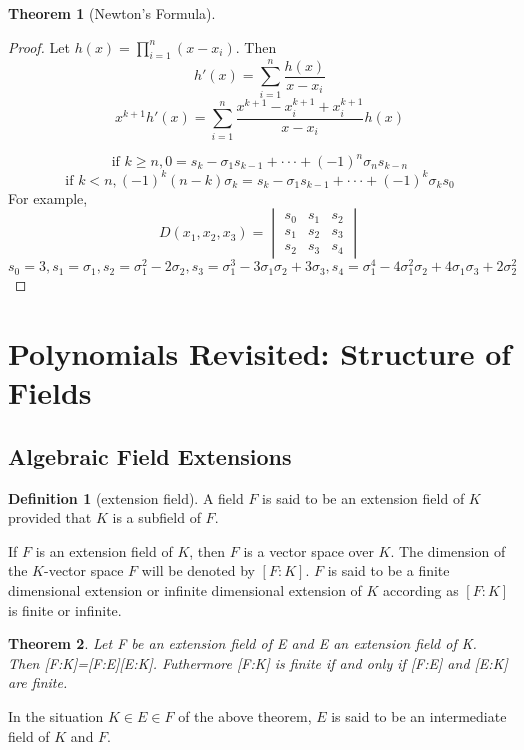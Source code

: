 \documentclass{book}
\newtheorem{theorem}{Theorem}[section]
\theoremstyle{definition}
\newtheorem{definition}{Definition}[section]
\begin{document}
\begin{theorem}[Newton's Formula]

\end{theorem}
\begin{proof}
Let $h(x)=\prod_{i=1}^{n}(x-x_i)$. Then \[h'(x)=\sum_{i=1}^{n} \frac{h(x)}{x-x_i}\]
\[x^{k+1}h'(x)=\sum_{i=1}^{n}\frac{x^{k+1}-x_i^{k+1}+x_i^{k+1}}{x-x_i}h(x)\]


\[\text{if } k\ge n, 0=s_k-\sigma_1s_{k-1}+\cdot \cdot \cdot +(-1)^n\sigma_ns_{k-n}\]
\[\text{if } k<n, (-1)^k(n-k)\sigma_k=s_k-\sigma_1s_{k-1}+\cdot \cdot \cdot +(-1)^k\sigma_ks_0\]
For example,\[D(x_1,x_2,x_3)=\begin{vmatrix}
  s_0& s_1 & s_2\\
  s_1& s_2 &s_3 \\
  s_2& s_3 &s_4
\end{vmatrix}
\]
\[s_0=3,s_1=\sigma_1,s_2=\sigma_1^2-2\sigma_2,s_3=\sigma_1^3-3\sigma_1
\sigma_2+3\sigma_3,s_4=\sigma_1^4-4\sigma_1^2\sigma_2+4\sigma_1\sigma_3
+2\sigma_2^2\]

\end{proof}


\section{Polynomials Revisited: Structure of Fields}
\subsection{Algebraic Field Extensions}
\begin{definition}[extension field]
A field $F$ is said to be an extension field of $K$ provided that $K$ is a subfield of $F$.
\end{definition}
If $F$ is an extension field of $K$, then $F$ is a vector space over $K$. The dimension of the $K$-vector space $F$ will be denoted by $[F:K]$. $F$ is said to be a finite dimensional extension or infinite dimensional extension of $K$ according as $[F:K]$ is finite or infinite.
\begin{theorem}
Let F be an extension field of E and E an extension field of K. Then [F:K]=[F:E][E:K]. Futhermore [F:K] is finite if and only if [F:E] and [E:K] are finite.
\end{theorem}
In the situation $K\in E\in F$ of the above theorem, $E$ is said to be an intermediate field of $K$ and $F$.
\end{document}
